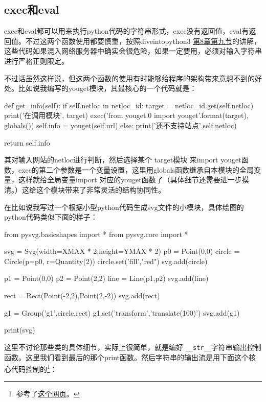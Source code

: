 \documentclass[12pt,oneside]{book}
\begin{document}
\begin{common-format}
\section{exec和eval}
exec和eval都可以用来执行python代码的字符串形式，exec没有返回值，eval有返回值。不过这两个函数使用都要慎重，按照diveintopython3 \href{http://www.diveintopython3.net/advanced-iterators.html}{第8章第九节}的讲解，这些代码如果混入网络服务器中确实会很危险，如果一定要用，必须对输入字符串进行严格正则限定。

不过话虽然这样说，但这两个函数的使用有时能够给程序的架构带来意想不到的好处。比如说我编写的youget模块，其最核心的一个代码就是：

\begin{tcbpython}[]
    def get_info(self):
        if self.netloc in netloc_id:
            target = netloc_id.get(self.netloc)
            print('在调用模块', target)
            exec('from youget.{0} import youget'.format(target), globals())
            self.info = youget(self.url)
        else:
            print('还不支持站点',self.netloc)

        return self.info
\end{tcbpython}

其对输入网站的netloc进行判断，然后选择某个 target模块 来import youget函数，exec的第二个参数是一个变量设置，这里用globals函数继承自本模块的全局变量，这样就给全局变量import 对应的youget函数了（具体细节还需要进一步摸清。）这给这个模块带来了非常灵活的结构协同性。

在比如说我写过一个根据小型python代码生成svg文件的小模块，具体绘图的python代码类似下面的样子：

\begin{tcbpython}[]
from pysvg.basicshapes import *
from pysvg.core import *

svg = Svg(width=XMAX * 2,height=YMAX * 2)
p0 = Point(0,0)
circle = Circle(p=p0, r=Quantity(2))
circle.set('fill',"red")
svg.add(circle)

p1 = Point(0,0)
p2 = Point(2,2)
line = Line(p1,p2)
svg.add(line)

rect = Rect(Point(-2,2),Point(2,-2))
svg.add(rect)

g1 = Group('g1',circle,rect)
g1.set('transform','translate(100)')
svg.add(g1)

print(svg)
\end{tcbpython}

这里不讨论那些类的具体细节，实际上很简单，就是编好 \verb+__str__+字符串输出控制函数。这里我们看到最后的那个print函数。然后字符串的输出流是用下面这个核心代码控制的\footnote{参考了\href{http://stackoverflow.com/questions/701802/how-do-i-execute-a-string-containing-python-code-in-python}{这个网页}。}：



\end{common-format}
\end{document}
